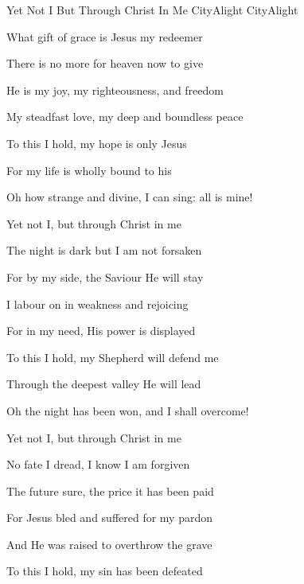 \documentclass[12pt]{book}
\begin{document}
\begin{song}{Yet Not I But Through Christ In Me}{}
  { CityAlight}
  {CityAlight}
  {}
  {}

  \begin{SBVerse}
    What gift of grace is Jesus my redeemer

    There is no more for heaven now to give

    He is my joy, my righteousness, and freedom

    My steadfast love, my deep and boundless peace
  \end{SBVerse}

  \begin{SBOpGroup}
    To this I hold, my hope is only Jesus

    For my life is wholly bound to his

    Oh how strange and divine, I can sing: all is mine!

    Yet not I, but through Christ in me
  \end{SBOpGroup}

  \begin{SBVerse}
    The night is dark but I am not forsaken

    For by my side, the Saviour He will stay

    I labour on in weakness and rejoicing

    For in my need, His power is displayed
  \end{SBVerse}

  \begin{SBOpGroup}
    To this I hold, my Shepherd will defend me

    Through the deepest valley He will lead

    Oh the night has been won, and I shall overcome!

    Yet not I, but through Christ in me
  \end{SBOpGroup}

  \begin{SBVerse}
    No fate I dread, I know I am forgiven

    The future sure, the price it has been paid

    For Jesus bled and suffered for my pardon

    And He was raised to overthrow the grave
  \end{SBVerse}

  \begin{SBOpGroup}
    To this I hold, my sin has been defeated


\end{SBOpGroup}
\end{song}
\end{document}
